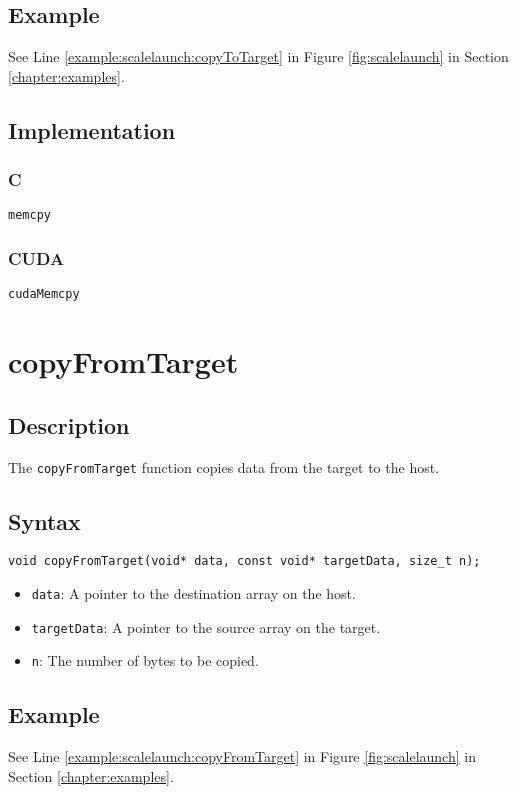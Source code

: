 \subsection{Example}
See Line \ref{example:scalelaunch:copyToTarget} in Figure \ref{fig:scalelaunch} in Section \ref{chapter:examples}.

\subsection{Implementation}
\subsubsection{C}
\verb+memcpy+
\subsubsection{CUDA}
\verb+cudaMemcpy+

\newpage
\section{copyFromTarget}

\subsection{Description}

The \verb+copyFromTarget+ function copies data from the target to the host.

\subsection{Syntax}
\begin{verbatim}
void copyFromTarget(void* data, const void* targetData, size_t n);
\end{verbatim}

\begin{itemize}
\item \verb+data+: A pointer to the destination array on the host.
\item \verb+targetData+: A pointer to the source array on the target.
\item \verb+n+: The number of bytes to be copied.
\end{itemize}


\subsection{Example}
See Line \ref{example:scalelaunch:copyFromTarget} in Figure \ref{fig:scalelaunch} in Section \ref{chapter:examples}.

